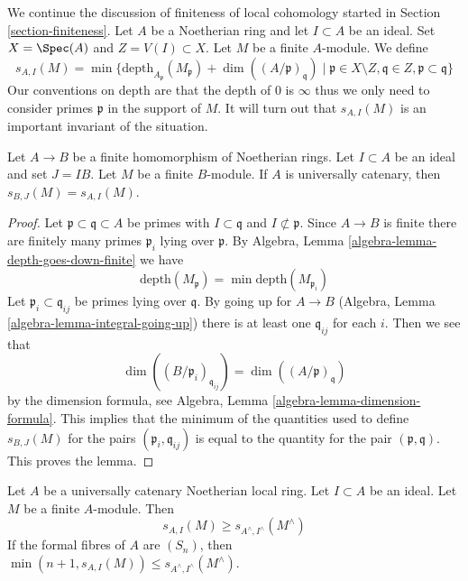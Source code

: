 \noindent
We continue the discussion of finiteness of local cohomology
started in Section \ref{section-finiteness}.
Let $A$ be a Noetherian ring and let $I \subset A$ be an ideal.
Set $X = \Spec(A)$ and $Z = V(I) \subset X$. Let $M$ be a finite $A$-module.
We define
\begin{equation}
\label{equation-cutoff}
s_{A, I}(M) =
\min \{
\text{depth}_{A_\mathfrak p}(M_\mathfrak p) + \dim((A/\mathfrak p)_\mathfrak q)
\mid
\mathfrak p \in X \setminus Z, \mathfrak q \in Z,
\mathfrak p \subset \mathfrak q
\}
\end{equation}
Our conventions on depth are that the depth of $0$ is $\infty$
thus we only need to consider primes $\mathfrak p$ in the support
of $M$. It will turn out that $s_{A, I}(M)$ is an important invariant of
the situation.

\begin{lemma}
\label{lemma-cutoff}
Let $A \to B$ be a finite homomorphism of Noetherian rings.
Let $I \subset A$ be an ideal and set $J = IB$. Let $M$ be
a finite $B$-module. If $A$ is universally catenary, then
$s_{B, J}(M) = s_{A, I}(M)$.
\end{lemma}

\begin{proof}
Let $\mathfrak p \subset \mathfrak q \subset A$ be primes with
$I \subset \mathfrak q$ and $I \not \subset \mathfrak p$.
Since $A \to B$ is finite there are finitely many primes
$\mathfrak p_i$ lying over $\mathfrak p$. By
Algebra, Lemma \ref{algebra-lemma-depth-goes-down-finite}
we have
$$
\text{depth}(M_\mathfrak p) = \min \text{depth}(M_{\mathfrak p_i})
$$
Let $\mathfrak p_i \subset \mathfrak q_{ij}$ be primes lying
over $\mathfrak q$. By going up for $A \to B$
(Algebra, Lemma \ref{algebra-lemma-integral-going-up})
there is at least one $\mathfrak q_{ij}$ for each $i$.
Then we see that
$$
\dim((B/\mathfrak p_i)_{\mathfrak q_{ij}}) =
\dim((A/\mathfrak p)_\mathfrak q)
$$
by the dimension formula, see
Algebra, Lemma \ref{algebra-lemma-dimension-formula}.
This implies that the minimum of the quantities
used to define $s_{B, J}(M)$
for the pairs $(\mathfrak p_i, \mathfrak q_{ij})$
is equal to the quantity for the pair $(\mathfrak p, \mathfrak q)$.
This proves the lemma.
\end{proof}

\begin{lemma}
\label{lemma-cutoff-completion}
Let $A$ be a universally catenary Noetherian local ring.
Let $I \subset A$ be an ideal. Let $M$ be
a finite $A$-module. Then
$$
s_{A, I}(M) \geq s_{A^\wedge, I^\wedge}(M^\wedge)
$$
If the formal fibres of $A$ are $(S_n)$, then
$\min(n + 1, s_{A, I}(M)) \leq s_{A^\wedge, I^\wedge}(M^\wedge)$.
\end{lemma}

